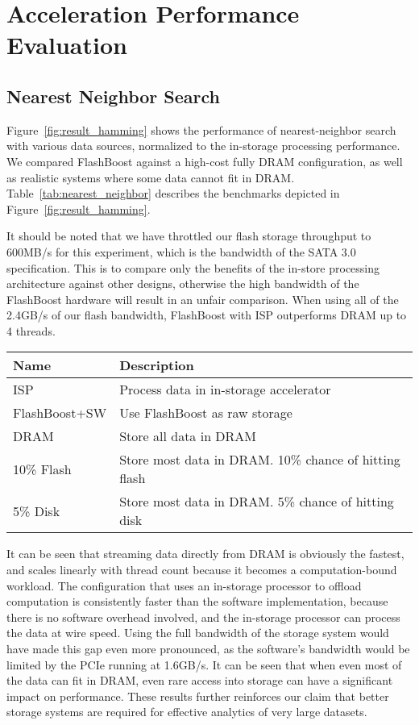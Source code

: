 \section{Acceleration Performance Evaluation}
\label{sec:results_acceleration}

\subsection{Nearest Neighbor Search}

Figure~\ref{fig:result_hamming} shows the performance of nearest-neighbor search
with various data sources, normalized to the in-storage processing performance.
We compared FlashBoost against a high-cost fully DRAM configuration, as well as
realistic systems where some data cannot fit in DRAM.
Table~\ref{tab:nearest_neighbor} describes the benchmarks depicted in
Figure~\ref{fig:result_hamming}.

It should be noted that we have throttled our flash storage throughput to
600MB/s for this experiment, which is the bandwidth of the SATA 3.0
specification. This is to compare only the benefits of the in-store processing
architecture against other designs, otherwise the high bandwidth of the
FlashBoost hardware will result in an unfair comparison. When using all of the
2.4GB/s of our flash bandwidth, FlashBoost with ISP outperforms DRAM up to 4 threads.

\begin{tabular}{l | p{0.25\paperwidth}}
\label{tab:nearest_neighbor}
Name & Description \\
\hline \hline
ISP & Process data in in-storage accelerator \\
FlashBoost+SW & Use FlashBoost as raw storage \\
DRAM & Store all data in DRAM \\
10\% Flash & Store most data in DRAM. 10\% chance of hitting flash \\
5\% Disk & Store most data in DRAM. 5\% chance of hitting disk \\
\hline
\end{tabular}

It can be seen that streaming data directly from DRAM is obviously the fastest, and
scales linearly with thread count because it becomes a computation-bound
workload. The configuration that uses an in-storage processor to offload
computation is consistently faster than the software implementation, because
there is no software overhead involved, and the in-storage processor can process
the data at wire speed. Using the full bandwidth of the storage system would
have made this gap even more pronounced, as the software's bandwidth would be
limited by the PCIe running at 1.6GB/s. It can be seen that when even most of
the data can fit in DRAM, even rare access into storage can have a significant
impact on performance. These results further reinforces our claim that better
storage systems are required for effective analytics of very large datasets.

